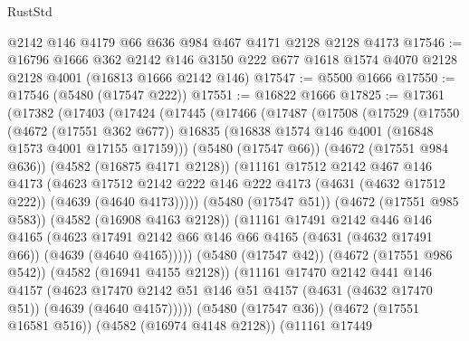 \begin{lexlean}{RustStd}
\begin{coremodule}
{\begin{coremodule}
{{{{{{{{{{{{{{{{    @2142
    @146
    @4179
    @66
    @636
    @984
    @467
    @4171
    @2128
    @2128
    @4173
@17546 := @16796
    @1666
    @362
    @2142
    @146
    @3150
    @222
    @677
    @1618
    @1574
    @4070
    @2128
    @2128
    @4001
    (@16813 @1666 @2142 @146)
@17547 := @5500 @1666
@17550 := @17546 (@5480 (@17547 @222))
@17551 := @16822 @1666
@17825 := @17361
    (@17382
      (@17403
        (@17424
          (@17445
            (@17466
              (@17487
                (@17508
                  (@17529
                    (@17550
                      (@4672 (@17551 @362 @677))
                      @16835
                      (@16838 @1574 @146 @4001 (@16848 @1573 @4001 @17155 @17159)))
                    (@5480 (@17547 @66))
                    (@4672 (@17551 @984 @636))
                    (@4582 (@16875 @4171 @2128))
                    (@11161
                      @17512
                      @2142
                      @467
                      @146
                      @4173
                      (@4623
                        @17512
                        @2142
                        @222
                        @146
                        @222
                        @4173
                        (@4631 (@4632 @17512 @222))
                        (@4639 (@4640 @4173)))))
                  (@5480 (@17547 @51))
                  (@4672 (@17551 @985 @583))
                  (@4582 (@16908 @4163 @2128))
                  (@11161
                    @17491
                    @2142
                    @446
                    @146
                    @4165
                    (@4623
                      @17491
                      @2142
                      @66
                      @146
                      @66
                      @4165
                      (@4631 (@4632 @17491 @66))
                      (@4639 (@4640 @4165)))))
                (@5480 (@17547 @42))
                (@4672 (@17551 @986 @542))
                (@4582 (@16941 @4155 @2128))
                (@11161
                  @17470
                  @2142
                  @441
                  @146
                  @4157
                  (@4623
                    @17470
                    @2142
                    @51
                    @146
                    @51
                    @4157
                    (@4631 (@4632 @17470 @51))
                    (@4639 (@4640 @4157)))))
              (@5480 (@17547 @36))
              (@4672 (@17551 @16581 @516))
              (@4582 (@16974 @4148 @2128))
              (@11161
                @17449
}}}}}}}}}}}}}}}}
\end{coremodule}}
\end{coremodule}
\end{lexlean}
